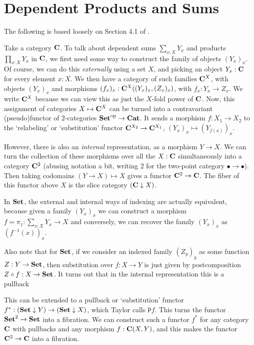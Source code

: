 \section{Dependent Products and Sums}\label{sec:dependent-products}
The following is based loosely on Section 4.1 of \autocite{taylor}.

Take a category $ \mathbf{C} $. To talk about dependent sums $ \sum_{x: X} Y_x $ and products $ \prod_{x: X} Y_x $ in $ \mathbf{C} $, we first need some way to construct the family of objects $ (Y_x)_x $. Of course, we can do this \textit{externally} using a set $ X $, and picking an object $ Y_x : \mathbf{C} $ for every element $ x : X $. We then have a category of such families $ \mathbf{C}^X $, with objects $ (Y_x)_x $ and morphisms $ (f_x)_x: \mathbf{C}^X((Y_x)_x, (Z_x)_x) $, with $ f_x: Y_x \to Z_x $. We write $ \mathbf{C}^X $ because we can view this as just the $ X $-fold power of $ \mathbf{C} $. Now, this assignment of categories $ X \mapsto \mathbf{C}^X $ can be turned into a contravariant (pseudo)functor of $ 2 $-categories $ \mathbf{Set}^{\text{op}} \to \mathbf{Cat} $. It sends a morphism $ f: X_1 \to X_2 $ to the `relabeling' or `substitution' functor $ \mathbf{C}^{X_2} \to \mathbf{C}^{X_1} $, $ (Y_x)_x \mapsto (Y_{f(x)})_x $.

However, there is also an \textit{internal} representation, as a morphism $ Y \to X $. We can turn the collection of these morphisms over all the $ X : \mathbf{C} $ simultaneously into a category $ \mathbf{C}^2 $ (abusing notation a bit, writing $ 2 $ for the two-point category $ \bullet \to \bullet $). Then taking codomains $ (Y \to X) \mapsto X $ gives a functor $ \mathbf{C}^2 \to \mathbf{C} $. The fiber of this functor above $ X $ is the slice category $ (\mathbf{C} \downarrow X) $.

In $ \mathbf{Set} $, the external and internal ways of indexing are actually equivalent, because given a family $ (Y_x)_x $ we can construct a morphism $ f = \pi_1: \sum_{x : X} Y_x \to X $ and conversely, we can recover the family $ (Y_x)_x $ as $ (f^{-1}(x))_x $.

Also note that for $ \mathbf{Set} $, if we consider an indexed family $ (Z_y)_y $ as some function $ Z: Y \to \mathbf{Set} $, then substitution over $ f: X \to Y $ is just given by postcomposition $ Z \circ f: X \to \mathbf{Set} $. It turns out that in the internal representation this is a pullback
\begin{center}
\end{center}
This can be extended to a pullback or `substitution' functor $ f^* : (\mathbf{Set} \downarrow Y) \to (\mathbf{Set} \downarrow X) $, which Taylor calls $ \mathtt{P} f $. This turns the functor $ \mathbf{Set}^2 \to \mathbf{Set} $ into a fibration. We can construct such a functor $ f^* $ for any category $ \mathbf{C} $ with pullbacks and any morphism $ f: \mathbf{C}(X, Y) $, and this makes the functor $ \mathbf{C}^2 \to \mathbf{C} $ into a fibration.

